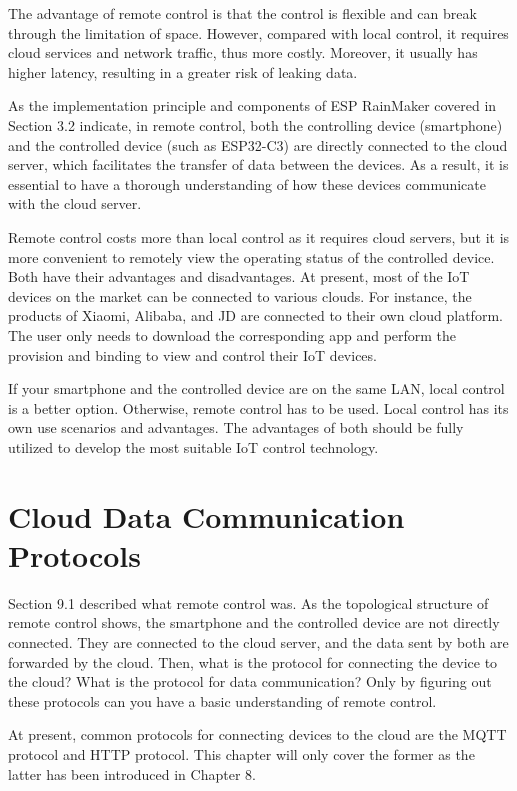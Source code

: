 \documentclass[a4paper,12pt,openany]{book}
\begin{document}
The advantage of remote control is that the control is flexible and can break through the limitation of space. However, compared with local control, it requires cloud services and network traffic, thus more costly. Moreover, it usually has higher latency, resulting in a greater risk of leaking data.

As the implementation principle and components of ESP RainMaker covered in Section 3.2 indicate, in remote control, both the controlling device (smartphone) and the controlled device (such as ESP32-C3) are directly connected to the cloud server, which facilitates the transfer of data between the devices. As a result, it is essential to have a thorough understanding of how these devices communicate with the cloud server.

Remote control costs more than local control as it requires cloud servers, but it is more convenient to remotely view the operating status of the controlled device. Both have their advantages and disadvantages. At present, most of the IoT devices on the market can be connected to various clouds. For instance, the products of Xiaomi, Alibaba, and JD are connected to their own cloud platform. The user only needs to download the corresponding app and perform the provision and binding to view and control their IoT devices.

If your smartphone and the controlled device are on the same LAN, local control is a better option. Otherwise, remote control has to be used. Local control has its own use scenarios and advantages. The advantages of both should be fully utilized to develop the most suitable IoT control technology.

\section{Cloud Data Communication Protocols}
Section 9.1 described what remote control was. As the topological structure of remote control shows, the smartphone and the controlled device are not directly connected. They are connected to the cloud server, and the data sent by both are forwarded by the cloud. Then, what is the protocol for connecting the device to the cloud? What is the protocol for data communication? Only by figuring out these protocols can you have a basic understanding of remote control.

At present, common protocols for connecting devices to the cloud are the MQTT protocol and HTTP protocol. This chapter will only cover the former as the latter has been introduced in Chapter 8.
\end{document}

